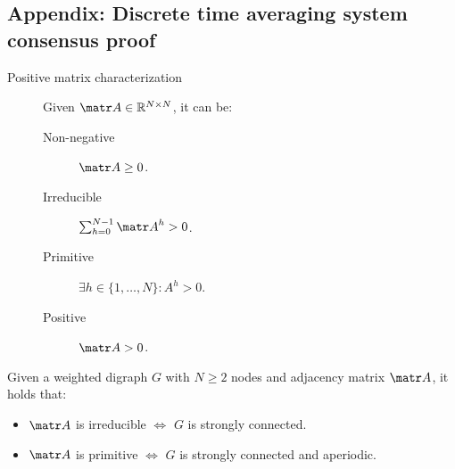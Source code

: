 \begin{subappendices}

\section{Appendix: Discrete time averaging system consensus proof}


\begin{description}
    \item[Positive matrix characterization]
        Given $\A \in \mathbb{R}^{N \times N}$, it can be:
        \begin{description}
            \item[Non-negative] 
                $\A \geq 0$.
            \item[Irreducible] 
                $\sum_{h=0}^{N-1} \A^h > 0$.
            \item[Primitive] 
                $\exists h \in \{ 1, \dots, N \}: A^h > 0$.
            \item[Positive] 
                $\A > 0$.
        \end{description}
\end{description}





\begin{theorem} \label{th:positive_matrix_digraph_connected}
    Given a weighted digraph $G$ with $N \geq 2$ nodes and adjacency matrix $\A$, it holds that:
    \begin{itemize}
        \item $\A$ is irreducible $\iff$ $G$ is strongly connected.
        \item $\A$ is primitive $\iff$ $G$ is strongly connected and aperiodic.
    \end{itemize}
\end{theorem}




\end{subappendices}
